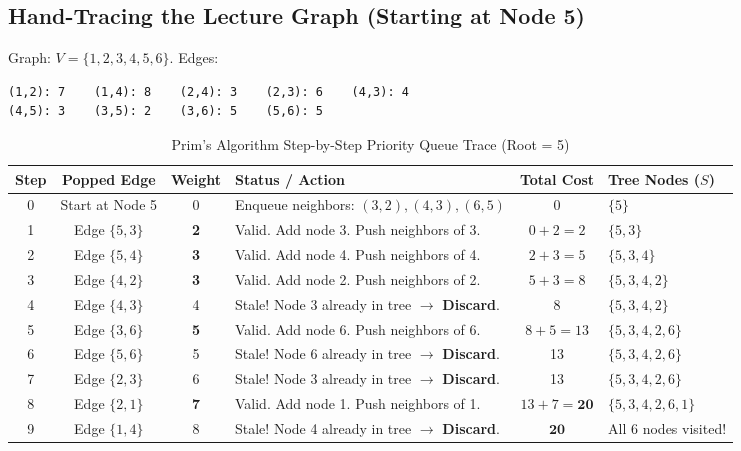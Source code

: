 \documentclass[10pt,journal,compsoc,onecolumn]{IEEEtran}
\begin{document}
\subsection{Hand-Tracing the Lecture Graph (Starting at Node 5)}

Graph: $V = \{1, 2, 3, 4, 5, 6\}$. Edges:
\begin{verbatim}
(1,2): 7    (1,4): 8    (2,4): 3    (2,3): 6    (4,3): 4
(4,5): 3    (3,5): 2    (3,6): 5    (5,6): 5
\end{verbatim}

\begin{table}[htbp]
\caption{Prim's Algorithm Step-by-Step Priority Queue Trace (Root = 5)}
\label{tab:prims_trace_clean}
\centering
\begin{tabular}{ccclcl}
\toprule
\textbf{Step} & \textbf{Popped Edge} & \textbf{Weight} & \textbf{Status / Action} & \textbf{Total Cost} & \textbf{Tree Nodes ($S$)} \\
\midrule
0 & Start at Node 5 & 0 & Enqueue neighbors: $(3,2), (4,3), (6,5)$ & 0 & $\{5\}$ \\
1 & Edge $\{5, 3\}$ & \textbf{2} & Valid. Add node 3. Push neighbors of 3. & $0 + 2 = 2$ & $\{5, 3\}$ \\
2 & Edge $\{5, 4\}$ & \textbf{3} & Valid. Add node 4. Push neighbors of 4. & $2 + 3 = 5$ & $\{5, 3, 4\}$ \\
3 & Edge $\{4, 2\}$ & \textbf{3} & Valid. Add node 2. Push neighbors of 2. & $5 + 3 = 8$ & $\{5, 3, 4, 2\}$ \\
4 & Edge $\{4, 3\}$ & 4 & Stale! Node 3 already in tree $\to$ \textbf{Discard}. & 8 & $\{5, 3, 4, 2\}$ \\
5 & Edge $\{3, 6\}$ & \textbf{5} & Valid. Add node 6. Push neighbors of 6. & $8 + 5 = 13$ & $\{5, 3, 4, 2, 6\}$ \\
6 & Edge $\{5, 6\}$ & 5 & Stale! Node 6 already in tree $\to$ \textbf{Discard}. & 13 & $\{5, 3, 4, 2, 6\}$ \\
7 & Edge $\{2, 3\}$ & 6 & Stale! Node 3 already in tree $\to$ \textbf{Discard}. & 13 & $\{5, 3, 4, 2, 6\}$ \\
8 & Edge $\{2, 1\}$ & \textbf{7} & Valid. Add node 1. Push neighbors of 1. & $13 + 7 = \mathbf{20}$ & $\{5, 3, 4, 2, 6, 1\}$ \\
9 & Edge $\{1, 4\}$ & 8 & Stale! Node 4 already in tree $\to$ \textbf{Discard}. & $\mathbf{20}$ & All 6 nodes visited! \\
\bottomrule
\end{tabular}
\end{table}
\end{document}
